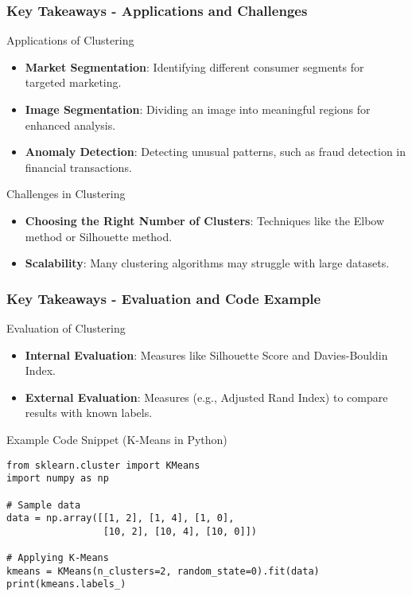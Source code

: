 \documentclass[aspectratio=169]{beamer}
\begin{document}
\begin{frame}[fragile]
    \frametitle{Key Takeaways - Applications and Challenges}
    \begin{block}{Applications of Clustering}
        \begin{itemize}
            \item \textbf{Market Segmentation}: Identifying different consumer segments for targeted marketing.
            \item \textbf{Image Segmentation}: Dividing an image into meaningful regions for enhanced analysis.
            \item \textbf{Anomaly Detection}: Detecting unusual patterns, such as fraud detection in financial transactions.
        \end{itemize}
    \end{block}
    
    \begin{block}{Challenges in Clustering}
        \begin{itemize}
            \item \textbf{Choosing the Right Number of Clusters}: Techniques like the Elbow method or Silhouette method.
            \item \textbf{Scalability}: Many clustering algorithms may struggle with large datasets.
        \end{itemize}
    \end{block}
\end{frame}

\begin{frame}[fragile]
    \frametitle{Key Takeaways - Evaluation and Code Example}
    \begin{block}{Evaluation of Clustering}
        \begin{itemize}
            \item \textbf{Internal Evaluation}: Measures like Silhouette Score and Davies-Bouldin Index.
            \item \textbf{External Evaluation}: Measures (e.g., Adjusted Rand Index) to compare results with known labels.
        \end{itemize}
    \end{block}

    \begin{block}{Example Code Snippet (K-Means in Python)}
        \begin{lstlisting}[basicstyle=\small]
from sklearn.cluster import KMeans
import numpy as np

# Sample data
data = np.array([[1, 2], [1, 4], [1, 0],
                 [10, 2], [10, 4], [10, 0]])

# Applying K-Means
kmeans = KMeans(n_clusters=2, random_state=0).fit(data)
print(kmeans.labels_)
        \end{lstlisting}
    \end{block}
\end{frame}
\end{document}
